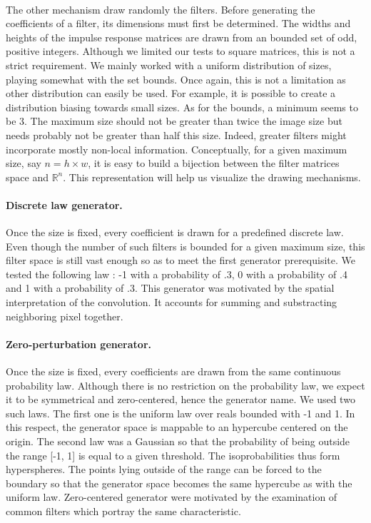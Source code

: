 \documentclass[a4paper]{report}
\begin{document}
			\paragraph{}
			The other mechanism draw randomly the filters. Before generating the coefficients of a filter, its dimensions must first be determined. The widths and heights of the impulse response matrices are drawn from an bounded set of odd, positive integers. Although we limited our tests to square matrices, this is not a strict requirement.
			We mainly worked with a uniform distribution of sizes, playing somewhat with the set bounds. Once again, this is not a limitation as other distribution can easily be used. For example, it is possible to create a distribution biasing towards small sizes. 
			As for the bounds, a minimum seems to be 3. The maximum size should not be greater than twice the image size but needs probably not be greater than half this size. Indeed, greater filters might incorporate mostly non-local information.
			Conceptually, for a given maximum size, say $n = h \times w$, it is easy to build a bijection between the filter matrices space and $\mathbb{R}^n$. This representation will help us visualize the drawing mechanisms.
			\paragraph{Discrete law generator.}
			Once the size is fixed, every coefficient is drawn for a predefined discrete law. Even though the number of such filters is bounded for a given maximum size, this filter space is still vast enough so as to meet the first generator prerequisite. We tested the following law : -1 with a probability of .3, 0 with a probability of .4 and 1 with a probability of .3.
			This generator was motivated by the spatial interpretation of the convolution. It accounts for summing and substracting neighboring pixel together.
			\paragraph{Zero-perturbation generator.}
			Once the size is fixed, every coefficients are drawn from the same continuous probability law. Although there is no restriction on the probability law, we expect it to be symmetrical and zero-centered, hence the generator name. We used two such laws. The first one is the uniform law over reals bounded with -1 and 1. In this respect, the generator space is mappable to an hypercube centered on the origin. The second law was a Gaussian so that the probability of being outside the range [-1, 1] is equal to a given threshold. The isoprobabilities thus form hyperspheres. The points lying outside of the range can be forced to the boundary so that the generator space becomes the same hypercube as with the uniform law. 
			Zero-centered generator were motivated by the examination of common filters which portray the same characteristic.
\end{document}
